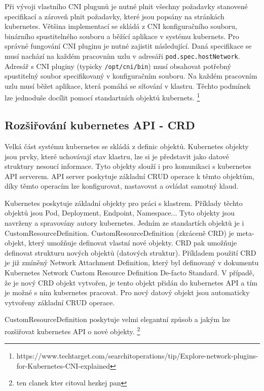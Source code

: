 Při vývoji vlastního CNI plugunů je nutné plnit všechny požadavky stanovené specifikací a zároveň plnit požadavky, které jsou popsány na stránkách kubernetes. Většina implementací se skládá z CNI konfiguračního souboru, binárního spustitelného souboru a běžící aplikace v systému kubernets. Pro správné fungování CNI pluginu je nutné zajistit následující. Daná specifikace se musí nachází na každém pracovním uzlu v adresáři \verb|pod.spec.hostNetwork|. Adresář s CNI pluginy (typicky \verb|/opt/cni/bin|) musí obsahovat potřebný spustitelný soubor specifikovaný v konfiguračním souboru. Na každém pracovním uzlu musí běžet aplikace, která pomáhá se síťování v klastru. Těchto podmínek lze jednoduše docílit pomocí standartních objektů kubernets. \footnote{https://www.techtarget.com/searchitoperations/tip/Explore-network-plugins-for-Kubernetes-CNI-explained}\\

\subsection{Rozšiřování kubernetes API - CRD}
Velká část systému kubernetes se skládá z definic objektů. Kubernetes objekty jsou prvky, které uchovávají stav klastru, lze si je představit jako datové struktury nesoucí informace. Tyto objekty slouží i pro komunikaci s kubernetes API serverem. API server poskytuje základní CRUD operace k těmto objektům, díky těmto operacím lze konfigurovat, nastavovat a ovládat samotný klaud.

Kubernetes poskytuje základní objekty pro práci s klastrem. Příklady těchto objektů jsou Pod, Deployment, Endpoint, Namespace... Tyto objekty jsou navrženy a spravovány autory kubernetes. Jedním ze standartích objektů je i CustomResourceDefinition. CustomResourceDefinition (zkráceně CRD) je meta-objekt, který umožňuje definovat vlastní nové objekty. CRD pak umožňuje definovat strukturu nových objektů (datových struktur). Příkladem použití CRD je již zmíněný Network Attachment Definition, který byl definovaný v dokumentu Kubernetes Network Custom Resource Definition De-facto Standard. V případě, že je nový CRD objekt vytvořen, je tento objekt přidán do kubernetes API a tím je možné s ním kubernetes pracovat. Pro nový datový objekt jsou automaticky vytvořeny základní CRUD operace.

CustomResourceDefinition poskytuje velmi elegantní způsob a jakým lze rozšiřovat kubernetes API o nové objekty.  
\footnote{ten clanek kter citoval hezkej pan}
